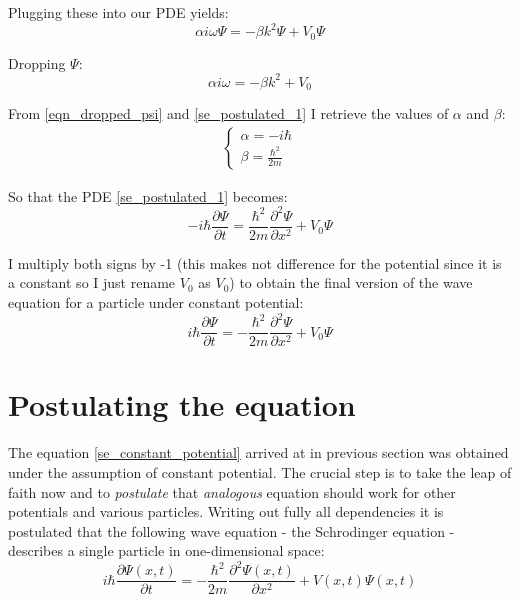 \documentclass[12pt]{article}
\begin{document}
Plugging these into our PDE yields:
\begin{equation*}
\alpha i \omega \Psi = - \beta k^2 \Psi + V_0 \Psi
\end{equation*}

Dropping $\Psi$:
\begin{equation}
\label{eqn_dropped_psi}
\alpha i \omega = - \beta k^2 + V_0
\end{equation}

From \eqref{eqn_dropped_psi} and \eqref{se_postulated_1} I retrieve the values of $\alpha$ and 
$\beta$:
\begin{eqnarray*}
\begin{cases}
\alpha = - i \hbar \\
\beta = \frac{\hbar^2}{2m}
\end{cases}
\end{eqnarray*}

So that the PDE \eqref{se_postulated_1} becomes:
\begin{equation*}
- i \hbar \frac{\partial \Psi}{\partial t} = 
\frac{\hbar^2}{2m} \frac{\partial^2 \Psi}{\partial x^2} + V_0 \Psi
\end{equation*}

I multiply both signs by -1 (this makes not difference 
for the potential since it is a constant so I just rename $V_0$ as $V_0$) to obtain the final version of the wave equation for a particle under constant potential:
\begin{equation}
\label{se_constant_potential}
i \hbar \frac{\partial \Psi}{\partial t} = 
- \frac{\hbar^2}{2m} \frac{\partial^2 \Psi}{\partial x^2} + V_0 \Psi
\end{equation}

\section{Postulating the equation}
The equation \eqref{se_constant_potential} arrived at in previous section was
obtained under the assumption of constant potential.
The crucial step is to take the leap of faith now and to \textit{postulate} that
\textit{analogous} equation should work for other potentials and various particles. Writing out fully all dependencies it is postulated that the following wave equation - the Schrodinger equation - describes a single particle in one-dimensional space:
\begin{equation}
\label{schrodinger_equation_1dim}
i \hbar \frac{\partial \Psi(x, t)}{\partial t} = 
- \frac{\hbar^2}{2m} \frac{\partial^2 \Psi(x, t)}{\partial x^2} + V(x, t) \Psi(x, t)
\end{equation}
\end{document}
